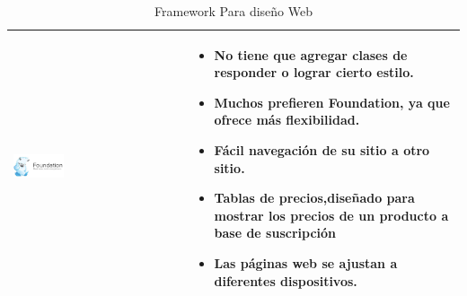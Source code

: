 \begin{table}[b!]
\begin{tabular}{|p{1cm}|l}
        \hline
          \multicolumn{1}{|p{5cm}|}{\includegraphics[width=0.3\textwidth]{images/foundation}} & 
          \multicolumn{1}{p{10cm}|}{ 
          \begin{itemize}
                 \vspace{-20mm}
          \setlist[itemize]{noitemsep, topsep=0pt}  
          	\item No tiene que agregar clases de responder o lograr cierto estilo.
			\item Muchos prefieren Foundation, ya que ofrece más flexibilidad.
			\item Fácil navegación de su sitio a otro sitio.
            \item Tablas de precios,diseñado para mostrar los precios de un producto a base de suscripción
            \item Las páginas web se ajustan a diferentes dispositivos.
         \end{itemize}}\\ 
        \hline
      \end{tabular}
      \caption{Framework Para diseño Web}
      \label{framwwork}
    \end{table}
\newpage
